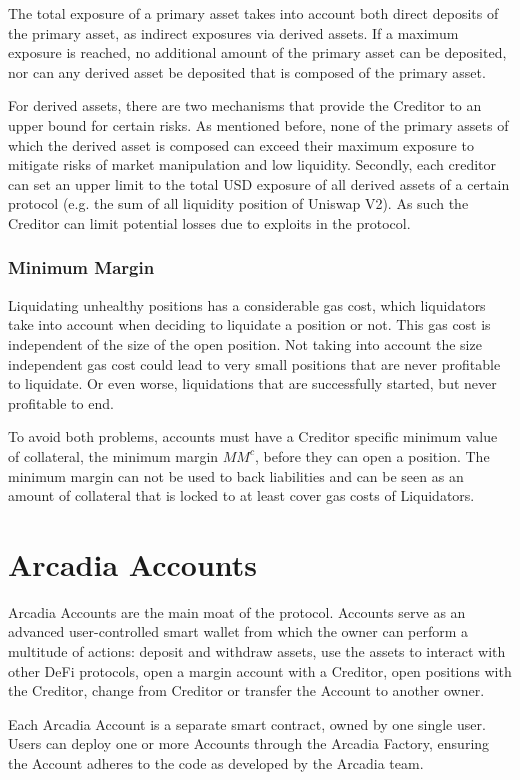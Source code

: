 \documentclass[sigconf,nonacm]{acmart}
\begin{document}
The total exposure of a primary asset takes into account both direct deposits of the primary asset, as indirect exposures via derived assets.
If a maximum exposure is reached, no additional amount of the primary asset can be deposited, nor can any derived asset be deposited that is composed of the primary asset.

For derived assets, there are two mechanisms that provide the Creditor to an upper bound for certain risks.
As mentioned before, none of the primary assets of which the derived asset is composed can exceed their maximum exposure to mitigate risks of market manipulation and low liquidity.
Secondly, each creditor can set an upper limit to the total USD exposure of all derived assets of a certain protocol (e.g. the sum of all liquidity position of Uniswap V2).
As such the Creditor can limit potential losses due to exploits in the protocol.

\subsubsection{Minimum Margin}
Liquidating unhealthy positions has a considerable gas cost, which liquidators take into account when deciding to liquidate a position or not.
This gas cost is independent of the size of the open position.
Not taking into account the size independent gas cost could lead to very small positions that are never profitable to liquidate.
Or even worse, liquidations that are successfully started, but never profitable to end.

To avoid both problems, accounts must have a Creditor specific minimum value of collateral, the minimum margin $MM^{c}$, before they can open a position.
The minimum margin can not be used to back liabilities and can be seen as an amount of collateral that is locked to at least cover gas costs of Liquidators.

\section{Arcadia Accounts}
\label{sec:arcadia-accounts}
Arcadia Accounts are the main moat of the protocol.
Accounts serve as an advanced user-controlled smart wallet from which the owner can perform a multitude of actions: deposit and withdraw assets,
use the assets to interact with other DeFi protocols, open a margin account with a Creditor, open positions with the Creditor,
change from Creditor or transfer the Account to another owner.

Each Arcadia Account is a separate smart contract, owned by one single user.
Users can deploy one or more Accounts through the Arcadia Factory, ensuring the Account adheres to the code as developed by the Arcadia team.
\end{document}
